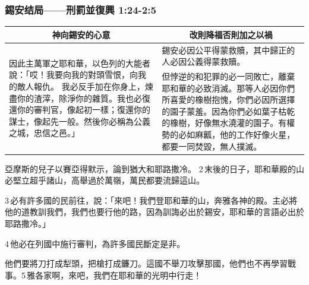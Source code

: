 \subsubsection{錫安结局——刑罰並復興 1:24-2:5}
\begin{table}[H]
\centering 
\begin{tabular}{p{7.8cm}|p{9.5cm}}\hline\hline
\multicolumn{1}{c|}{神向錫安的心意}&\multicolumn{1}{c}{改則降福否則加之以禍}\\\hline
\multirow{2}{7.9cm}{因此主萬軍之耶和華，以色列的大能者說：「哎！我要向我的對頭雪恨，向我的敵人報仇。 我必反手加在你身上，煉盡你的渣滓，除淨你的雜質。我也必復還你的審判官，像起初一樣；復還你的謀士，像起先一般。然後你必稱為公義之城，忠信之邑。」}
&錫安必因公平得蒙救贖，其中歸正的人必因公義得蒙救贖。\\\cline{2-2}
&但悖逆的和犯罪的必一同敗亡，離棄耶和華的必致消滅。那等人必因你們所喜愛的橡樹抱愧，你們必因所選擇的園子蒙羞。因為你們必如葉子枯乾的橡樹，好像無水澆灌的園子。有權勢的必如麻瓤，他的工作好像火星，都要一同焚毀，無人撲滅。\\\hline
\end{tabular}
\end{table}
 



亞摩斯的兒子以賽亞得默示，論到猶大和耶路撒冷。
2 末後的日子，耶和華殿的山必堅立超乎諸山，高舉過於萬嶺，萬民都要流歸這山。 

3 必有許多國的民前往，說：「來吧！我們登耶和華的山，奔雅各神的殿。主必將他的道教訓我們，我們也要行他的路，因為訓誨必出於錫安，耶和華的言語必出於耶路撒冷。」 

4 他必在列國中施行審判，為許多國民斷定是非。

他們要將刀打成犁頭，把槍打成鐮刀。這國不舉刀攻擊那國，他們也不再學習戰事。5 雅各家啊，來吧，我們在耶和華的光明中行走！ 


